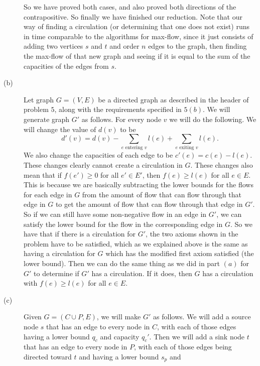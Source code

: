 \documentclass{article}
\begin{document}
\begin{description}
        So we have proved both cases, and also proved both directions of the
        contrapositive. So finally we have finished our reduction. Note that our
        way of finding a circulation (or determining that one does not exist)
        runs in time comparable to the algorithms for max-flow, since it just
        consists of adding two vertices $s$ and $t$ and order $n$ edges to the
        graph, then finding the max-flow of that new graph and seeing if it is
        equal to the sum of the capacities of the edges from $s$.
    \item[(b)]
        Let graph $G = (V,E)$ be a directed graph as described in the header of
        problem $5$, along with the requirements specified in $5(b)$. We will
        generate graph $G'$ as follows. For every node $v$
        we will do the following. We will change the value
        of $d(v)$ to be
        \[ d'(v) = d(v) - \sum_{e \mbox{ entering } v}l(e) + \sum_{e \mbox{ exiting }
        v}l(e). \]
        We also change the capacities of each edge to be $c'(e) = c(e) - l(e)$.
        These changes clearly cannot create a circulation in $G$.
        These changes also mean that if $f(e') \ge 0$ for all $e' \in E'$,
        then $f(e) \ge l(e)$ for all $e \in E$. This is because we are basically
        subtracting the lower bounds for the flows for each edge in $G$ from
        the amount of flow that can flow through that edge in $G$ to get the amount
        of flow that can flow through that edge in $G'$. So if we can
        still have some non-negative flow in an edge in $G'$, we can satisfy the lower bound for
        the flow in the corresponding edge in $G$. So we have that if there is a
        circulation for $G'$, the two axioms shown in the problem have to be
        satisfied, which as we explained above is the same as having a
        circulation for $G$ which has the modified first axiom satisfied (the
        lower bound).  Then we can do
        the same thing as we did in part $(a)$ for $G'$ to determine if $G'$ has
        a circulation. If it does, then $G$ has
        a circulation with $f(e) \ge l(e)$ for all $e \in E$.
    \item[(c)]
        Given $G = (C \cup P, E)$, we will make $G'$ as follows. We will add a
        source node $s$ that has an edge to every node in $C$, with each of
        those edges having a lower bound $q_c$ and capacity $q_c'$. Then we will
        add a sink node $t$ that has an edge to every node in $P$, with each of
        those edges being directed toward $t$ and having a lower bound $s_p$ and

\end{description}
\end{document}
